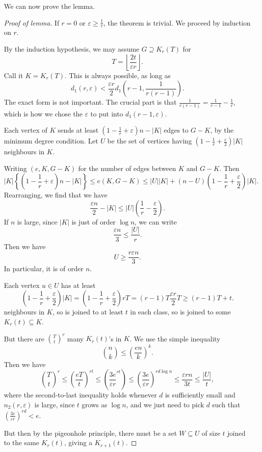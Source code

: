 \documentclass[a4paper]{article}
\begin{document}
We can now prove the lemma.

\begin{proof}[Proof of lemma]
  If $r = 0$ or $\varepsilon \geq \frac{1}{r}$, the theorem is trivial. We proceed by induction on $r$.

  By the induction hypothesis, we may assume $G \supseteq K_r(T)$ for
  \[
    T = \left\lfloor \frac{2t}{\varepsilon r}\right\rfloor.
  \]
  Call it $K = K_r(T)$. This is always possible, as long as
  \[
    d_1(r, \varepsilon) < \frac{\varepsilon r}{2} d_1\left(r - 1, \frac{1}{r(r - 1)}\right).
  \]
  The exact form is not important. The crucial part is that $\frac{1}{r(r - 1)} = \frac{1}{r - 1} - \frac{1}{r}$, which is how we chose the $\varepsilon$ to put into $d_1(r - 1, \varepsilon)$.

  Each vertex of $K$ sends at least $\left(1 - \frac{1}{r} + \varepsilon\right)n - |K|$ edges to $G - K$, by the minimum degree condition. Let $U$ be the set of vertices having $\left(1 - \frac{1}{r} + \frac{\varepsilon}{2}\right)|K|$ neighbours in $K$.

  Writing $(e, K, G - K)$ for the number of edges between $K$ and $G - K$. Then
  \[
    |K| \left\{\left(1 - \frac{1}{r} + \varepsilon\right)n - |K|\right\} \leq e(K, G - K)  \leq |U||K| + (n - U) \left(1 - \frac{1}{r} + \frac{\varepsilon}{2}\right)|K|.
  \]
  Rearranging, we find that we have
  \[
    \frac{\varepsilon n}{2} - |K| \leq |U| \left(\frac{1}{r} - \frac{\varepsilon}{2}\right).
  \]
  If $n$ is large, since $|K|$ is just of order $\log n$, we can write
  \[
    \frac{\varepsilon n}{3} \leq \frac{|U|}{r}.
  \]
  Then we have
  \[
    U \geq \frac{r\varepsilon n}{3}.
  \]
  In particular, it is of order $n$.

  Each vertex $u \in U$ has at least
  \[
    \left(1 - \frac{1}{r} + \frac{\varepsilon}{2}\right) |K| = \left(1 - \frac{1}{r} + \frac{\varepsilon}{2}\right) rT = (r - 1)T \frac{\varepsilon r}{2}T \geq (r - 1)T + t.
  \]
  neighbours in $K$, so is joined to at least $t$ in each class, so is joined to some $K_r(t) \subseteq K$.

  But there are $\binom{T}{t}^r$ many $K_r(t)$'s in $K$. We use the simple inequality
  \[
    \binom{n}{k} \leq \left(\frac{e n}{k}\right)^k.
  \]
  Then we have
  \[
    \binom{T}{t}^r \leq \left(\frac{eT}{t}\right)^{rt} \leq \left(\frac{3e}{\varepsilon r}^{rt}\right) \leq \left(\frac{3e}{\varepsilon r}\right)^{rd\log n} \leq \frac{\varepsilon r n}{3t} \leq \frac{|U|}{t},
  \]
  where the second-to-last inequality holds whenever $d$ is sufficiently small and $n_2(r, \varepsilon)$ is large, since $t$ grows as $\log n$, and we just need to pick $d$ such that $\left(\frac{3e}{\varepsilon r}\right)^{rd} < e$.

  But then by the pigeonhole principle, there must be a set $W \subseteq U$ of size $t$ joined to the same $K_r(t)$, giving a $K_{r + 1}(t)$.
\end{proof}
\end{document}
